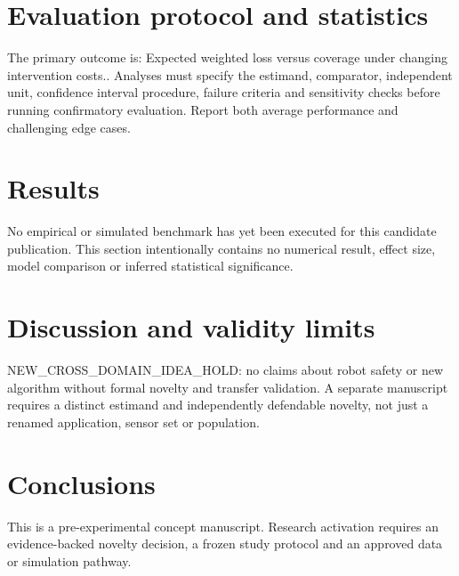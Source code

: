 \documentclass[11pt,a4paper]{article}
\begin{document}
\section{Evaluation protocol and statistics}
The primary outcome is: Expected weighted loss versus coverage under changing intervention costs.. Analyses must specify the estimand, comparator, independent unit, confidence interval procedure, failure criteria and sensitivity checks before running confirmatory evaluation. Report both average performance and challenging edge cases.
\section{Results}
No empirical or simulated benchmark has yet been executed for this candidate publication. This section intentionally contains no numerical result, effect size, model comparison or inferred statistical significance.
\section{Discussion and validity limits}
NEW\_CROSS\_DOMAIN\_IDEA\_HOLD: no claims about robot safety or new algorithm without formal novelty and transfer validation. A separate manuscript requires a distinct estimand and independently defendable novelty, not just a renamed application, sensor set or population.
\section{Conclusions}
This is a pre-experimental concept manuscript. Research activation requires an evidence-backed novelty decision, a frozen study protocol and an approved data or simulation pathway.
\end{document}
